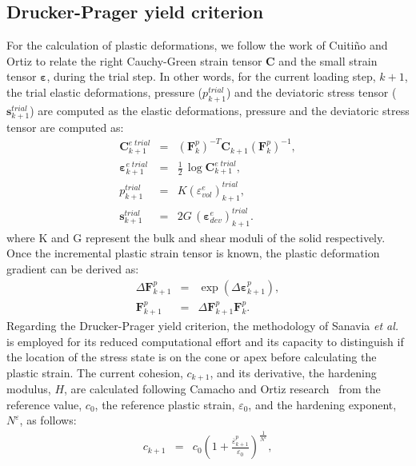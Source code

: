 \documentclass[twocolumn]{svjour3}          %
\begin{document}
{\subsection{Drucker-Prager yield criterion}
\label{subsec:32}
For the calculation of  plastic deformations, we follow the work of Cuiti\~no and Ortiz \cite{cuitino:92} to relate the right Cauchy-Green strain tensor $\mathbf{C}$ and the small strain tensor $\boldsymbol{\varepsilon}$, during the trial step. In other words, for the current loading step, $k+1$, 
the trial elastic deformations, pressure ($p^{trial}_{k+1}$)  and the deviatoric stress tensor ($\mathbf{s}^{trial}_{k+1} $) are computed as the elastic deformations, pressure  and the deviatoric stress tensor are computed as:
\begin{eqnarray}
\label{eq_dp1}
\mathbf{C}^{e\;trial}_{k+1} &=& (\mathbf{F}^p_{k})^{-T}\mathbf{C}_{k+1}(\mathbf{F}^p_{k})^{-1}, \\
 \label{eq_dp2}
\boldsymbol{\varepsilon}^{e\; trial}_{k+1} &=& \frac{1}{2}\,\log\mathbf{C}^{e\; trial}_{k+1},
\\ \label{eq_dp3}
p^{trial}_{k+1} &=& K \left(\varepsilon^{e}_{vol}\right)^{trial}_{k+1},
\\ \label{eq_dp4}
\mathbf{s}^{trial}_{k+1} &=& 2G\,\left(\boldsymbol{\varepsilon}^{e}_{dev}\right)^{trial}_{k+1}.
\end{eqnarray}
where K and G represent the bulk and shear moduli of the solid respectively. Once the incremental plastic strain tensor is known, the plastic deformation gradient can be derived as:
\begin{eqnarray}\label{eq_dp5}
\Delta \mathbf{F}_{k+1}^{p} &=&\exp (\Delta\boldsymbol{\varepsilon}_{k+1}^{p}), \\
 \label{eq_dp6}
\mathbf{F}_{k+1}^{p} &=&\Delta \mathbf{F}_{k+1}^{p} \mathbf{F}_{k}^{p}.
\end{eqnarray}
 Regarding the Drucker-Prager yield criterion, the methodology of Sanavia  {\it et al.}~\cite{Sanavia:02,Sanavia:06} is employed for  its reduced computational effort and its capacity to distinguish if the location of the stress  state is on the cone or apex before calculating the plastic strain.
The current cohesion, $c_{k+1}$, and its derivative, the hardening modulus, $H$, are calculated following Camacho and Ortiz research~\cite{Camacho:97} from the reference value, $c_{0}$, the reference plastic strain, $\varepsilon_0$, and  the hardening exponent, $N^\varepsilon$, as follows:
\begin{eqnarray}\label{eq_dp7}
c_{k+1} &=& c_{0}\left( 1+\frac{\overline{\varepsilon}^p_{k+1}}{\varepsilon_0}\right)^{\frac{1}{N^\varepsilon}},

\end{eqnarray}}
\end{document}
